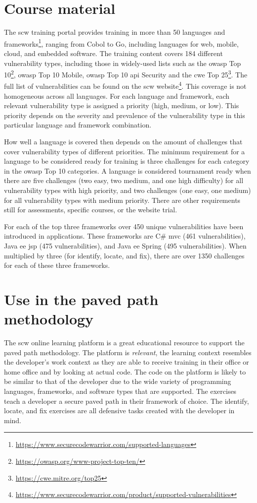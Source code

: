 \section{Course material}
The \gls{scw} training portal provides training in more than 50 languages and frameworks\footnote{\url{https://www.securecodewarrior.com/supported-languages}}, ranging from Cobol to Go, including languages for web, mobile, cloud, and embedded software.
The training content covers 184 different vulnerability types, including those in widely-used lists such as the \gls{owasp} Top 10\footnote{\url{https://owasp.org/www-project-top-ten/}}, \gls{owasp} Top 10 Mobile, \gls{owasp} Top 10 \gls{api} Security and the \gls{cwe} Top 25\footnote{\url{https://cwe.mitre.org/top25}}.
The full list of vulnerabilities can be found on the \gls{scw} website\footnote{\url{https://www.securecodewarrior.com/product/supported-vulnerabilities}}.
This coverage is not homogeneous across all languages.
For each language and framework, each relevant vulnerability type is assigned a priority (high, medium, or low).
This priority depends on the severity and prevalence of the vulnerability type in this particular language and framework combination.

How well a language is covered then depends on the amount of challenges that cover vulnerability types of different priorities. 
The minimum requirement for a language to be considered ready for training is three challenges for each category in the \gls{owasp} Top 10 categories.
A language is considered tournament ready when there are five challenges (two easy, two medium, and one high difficulty) for all vulnerability types with high priority, and two challenges (one easy, one medium) for all vulnerability types with medium priority.
There are other requirements still for assessments, specific courses, or the website trial.

For each of the top three frameworks over 450 unique vulnerabilities have been introduced in applications. These frameworks are C\# \gls{mvc} (461 vulnerabilities), Java \gls{ee} \gls{jsp} (475 vulnerabilities), and Java \gls{ee} Spring (495 vulnerabilities). When multiplied by three (for identify, locate, and fix), there are over 1350 challenges for each of these three frameworks.

\section{Use in the paved path methodology}
The \gls{scw} online learning platform is a great educational resource to support the paved path methodology.
The platform is \textit{relevant}, the learning context resembles the developer's work context as they are able to receive training in their office or home office and by looking at actual code. 
The code on the platform is likely to be similar to that of the developer due to the wide variety of programming languages, frameworks, and software types that are supported. 
The exercises teach a developer a secure paved path in their framework of choice. The identify, locate, and fix exercises are all defensive tasks created with the developer in mind.

